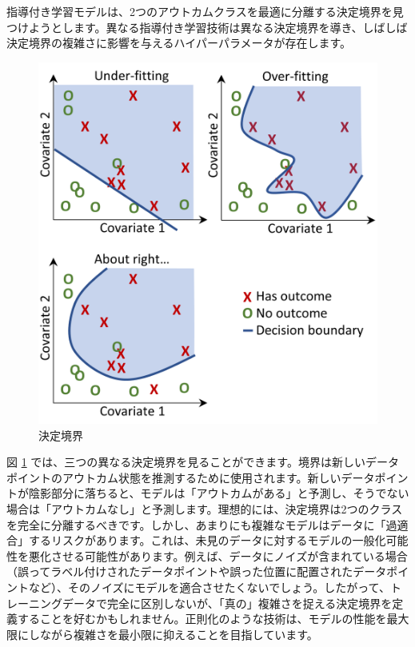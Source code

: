 \documentclass[
  11pt]{book}
\theoremstyle{definition}
\theoremstyle{definition}
\theoremstyle{definition}
\theoremstyle{definition}
\theoremstyle{remark}
\begin{document}
指導付き学習モデルは、2つのアウトカムクラスを最適に分離する決定境界を見つけようとします。異なる指導付き学習技術は異なる決定境界を導き、しばしば決定境界の複雑さに影響を与えるハイパーパラメータが存在します。 

\begin{figure}

{\centering \includegraphics[width=0.8\linewidth]{images/PatientLevelPrediction/decisionBoundary} 

}

\caption{決定境界}\label{fig:decisionBoundary}
\end{figure}

図 \ref{fig:decisionBoundary} では、三つの異なる決定境界を見ることができます。境界は新しいデータポイントのアウトカム状態を推測するために使用されます。新しいデータポイントが陰影部分に落ちると、モデルは「アウトカムがある」と予測し、そうでない場合は「アウトカムなし」と予測します。理想的には、決定境界は2つのクラスを完全に分離するべきです。しかし、あまりにも複雑なモデルはデータに「過適合」するリスクがあります。これは、未見のデータに対するモデルの一般化可能性を悪化させる可能性があります。例えば、データにノイズが含まれている場合（誤ってラベル付けされたデータポイントや誤った位置に配置されたデータポイントなど）、そのノイズにモデルを適合させたくないでしょう。したがって、トレーニングデータで完全に区別しないが、「真の」複雑さを捉える決定境界を定義することを好むかもしれません。正則化のような技術は、モデルの性能を最大限にしながら複雑さを最小限に抑えることを目指しています。
\end{document}
